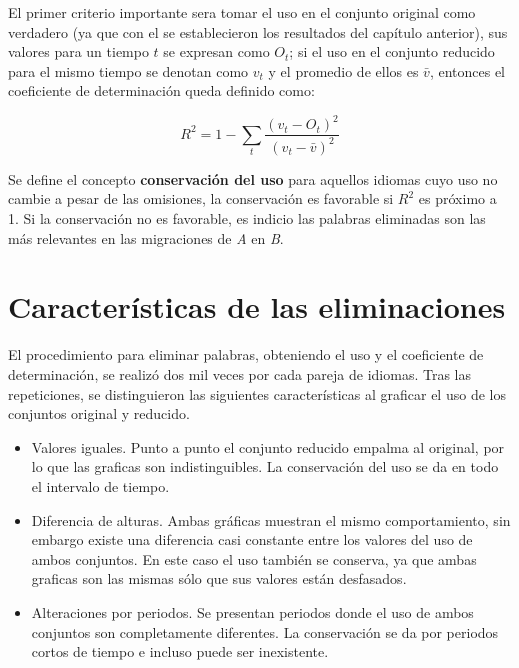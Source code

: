 El primer criterio importante sera tomar el uso en el conjunto original como verdadero (ya que con el se establecieron los resultados del capítulo anterior), sus valores para un tiempo $t$ se expresan como $O_{t}$; si el uso en el conjunto reducido para el mismo tiempo se denotan como  $v_{t}$ y el promedio de ellos es $\bar{v}$, entonces   el coeficiente de determinación queda definido como:

\begin{equation}
\label{ec.dif_uso}
R^{2} = 1 - \sum_{t} \frac{ \left( v_{t}- O_{t} \right)^{2}  }{ \left( v_{t} - \bar{v} \right)^{2} }
\end{equation}

Se define el concepto \textbf{conservación del uso} para aquellos idiomas cuyo uso no cambie a pesar de las omisiones, la conservación es favorable si $R^{2}$ es próximo a 1.  Si la conservación no es favorable, es indicio las palabras eliminadas son las más relevantes en las migraciones de \textit{A} en \textit{B}.

\section{Características de las eliminaciones}

El procedimiento para eliminar palabras, obteniendo el uso y el coeficiente de determinación, se realizó dos mil veces por cada pareja de idiomas.  Tras las repeticiones, se distinguieron las siguientes características al graficar el uso de los conjuntos original y reducido. 


\begin{itemize}
	
	\item Valores iguales. Punto a punto el conjunto reducido empalma al original, por lo que las graficas son indistinguibles. La conservación del uso se da en todo el intervalo de tiempo. 
	
	\item Diferencia de alturas. Ambas gráficas muestran el mismo comportamiento, sin embargo existe una diferencia casi constante entre
	los valores del uso de ambos conjuntos. En este caso el uso también se conserva, ya que ambas graficas son las mismas sólo que sus valores están desfasados. 
	
	\item Alteraciones por periodos.  Se presentan periodos donde el uso de ambos conjuntos son completamente diferentes. La conservación se da por periodos cortos de tiempo e incluso puede ser inexistente.
	
\end{itemize}

